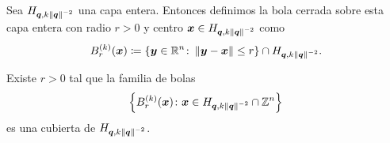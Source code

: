 Sea $H_{\boldsymbol{q}, k\left\lVert \boldsymbol{q} \right\rVert^{-2}}$ una capa entera. Entonces definimos la bola cerrada sobre
esta capa entera con radio $r > 0$ y centro $\boldsymbol{x} \in H_{\boldsymbol{q}, k\left\lVert \boldsymbol{q} \right\rVert^{-2}}$ como
\begin{equation}
	\label{eq:k-ball}
	B_r^{(k)}(\boldsymbol{x}) \coloneq \lbrace \boldsymbol{y} \in \mathbb{R}^n \colon \left\lVert \boldsymbol{y} - \boldsymbol{x} \right\rVert \leq r
	\rbrace \cap H_{\boldsymbol{q}, k \left\lVert \boldsymbol{q} \right\rVert^{-2}}.
\end{equation}
\begin{lemma}
	\label{lemma:ball-cover}
	Existe $r > 0$ tal que la familia de bolas
	\begin{equation*}
		\left\lbrace B_r^{(k)}(\boldsymbol{x}) \colon \boldsymbol{x} \in H_{\boldsymbol{q}, k\left\lVert \boldsymbol{q} \right\rVert^{-2}} \cap
			\mathbb{Z}^n \right\rbrace
	\end{equation*}
	es una cubierta de $H_{\boldsymbol{q}, k\left\lVert \boldsymbol{q} \right\rVert^{-2}}$.
\end{lemma}
